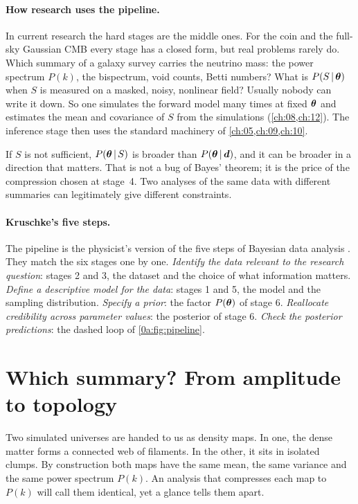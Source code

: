 \paragraph{How research uses the pipeline.}
In current research the hard stages are the middle ones. For the coin and the
full-sky Gaussian CMB every stage has a closed form, but real problems rarely
do. Which summary of a galaxy survey carries the neutrino mass: the power
spectrum $P(k)$, the bispectrum, void counts, Betti numbers? What is
$P(S\,\vert\,\bm{\theta})$ when $S$ is measured on a masked, noisy, nonlinear field?
Usually nobody can write it down. So one simulates the forward model many
times at fixed $\bm{\theta}$ and estimates the mean and covariance of $S$ from the
simulations (\cref{ch:08,ch:12}). The inference stage then uses the standard
machinery of \cref{ch:05,ch:09,ch:10}.

\begin{pitfall}
If $S$ is not sufficient, $P(\bm{\theta}\,\vert\, S)$ is broader than
$P(\bm{\theta}\,\vert\,\bm{d})$, and it can be broader in a direction that matters. That
is not a bug of Bayes' theorem; it is the price of the compression chosen at
stage~4. Two analyses of the same data with different summaries can
legitimately give different constraints.
\end{pitfall}

\paragraph{Kruschke's five steps.}
The pipeline is the physicist's version of the five steps of Bayesian data
analysis . They match the six stages one by one.
\emph{Identify the data relevant to the research question}: stages 2 and 3,
the dataset and the choice of what information matters. \emph{Define a
descriptive model for the data}: stages 1 and 5, the model and the sampling
distribution. \emph{Specify a prior}: the factor $P(\bm{\theta})$ of stage 6.
\emph{Reallocate credibility across parameter values}: the posterior of
stage 6. \emph{Check the posterior predictions}: the dashed loop of
\cref{0a:fig:pipeline}.

\section{Which summary? From amplitude to topology}\label{0a:sec:summaries}

Two simulated universes are handed to us as density maps. In one, the dense
matter forms a connected web of filaments. In the other, it sits in isolated
clumps. By construction both maps have the same mean, the same variance and
the same power spectrum $P(k)$. An analysis that compresses each map to $P(k)$
will call them identical, yet a glance tells them apart.

